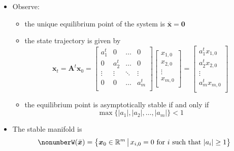 \documentclass[12pt,a4paper]{article}
\begin{document}
\begin{itemize}
\begin{itemize}
  \item Observe:
    \begin{itemize}
    \item the unique equilibrium point of the system is $\bar{\bm{x}}=\bm{0}$
    \item the state trajectory is given by
      \begin{equation}\nonumber%
        \bm{x}_{t}
        =
        \bm{A}^{t}\bm{x}_{0}
        =
      \begin{bmatrix}
        a_{1}^{t} & 0 & \ldots & 0 \\
        0 & a_{2}^{t} & \ldots & 0 \\
        \vdots & \vdots & \ddots & \vdots \\
        0 & 0 & \ldots & a_{m}^{t} \\
      \end{bmatrix}
      \begin{bmatrix}
        x_{1,0} \\
        x_{2,0} \\
        \vdots \\
        x_{m,0} \\
      \end{bmatrix}
      =
      \begin{bmatrix}
        a_{1}^{t}x_{1,0} \\
        a_{2}^{t}x_{2,0} \\
        \vdots \\
        a_{m}^{t}x_{m,0} \\
      \end{bmatrix}
      \end{equation}
    \item the equilibrium point is asymptotically stable if and only if
      \begin{equation}\nonumber%
        \max\{|a_{1}|, |a_{2}|, \ldots, |a_{m}|\}<1
      \end{equation}
    \end{itemize}

  \item The stable manifold is
    \begin{equation}\nonumber%
      W(\bar{\bm{x}}) =
      \left\{ \bm{x}_{0} \in \R^{m}
        \,\big|\,
        \text{$x_{i,0} = 0$ for $i$ such that $|a_{i}|\geq 1$}
      \right\}
    \end{equation}
  \end{itemize}


\end{itemize}
\end{document}
